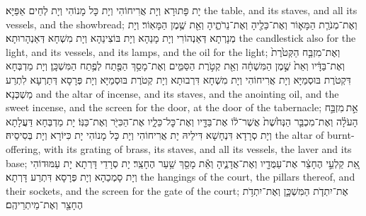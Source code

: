 {{יָת פָּתוּרָא וְיָת אֲרִיחוֹהִי וְיָת כָּל מָנוֹהִי וְיָת לְחֵים אַפַּיָּא׃}
{the table, and its staves, and all its vessels, and the showbread;}{}
{וְאֶת־מְנֹרַ֧ת הַמָּא֛וֹר וְאֶת־כֵּלֶ֖יהָ וְאֶת־נֵרֹתֶ֑יהָ וְאֵ֖ת שֶׁ֥מֶן הַמָּאֽוֹר׃
}
{וְיָת מְנָרְתָא דְּאַנְהוֹרִי וְיָת מָנַהָא וְיָת בּוֹצִינַהָא וְיָת מִשְׁחָא דְּאַנְהָרוּתָא׃}
{the candlestick also for the light, and its vessels, and its lamps, and the oil for the light;}{}
{וְאֶת־מִזְבַּ֤ח הַקְּטֹ֙רֶת֙ וְאֶת־בַּדָּ֔יו וְאֵת֙ שֶׁ֣מֶן הַמִּשְׁחָ֔ה וְאֵ֖ת קְטֹ֣רֶת הַסַּמִּ֑ים וְאֶת־מָסַ֥ךְ הַפֶּ֖תַח לְפֶ֥תַח הַמִּשְׁכָּֽן׃
}
{וְיָת מַדְבְּחָא דִּקְטֹרֶת בּוּסְמַיָּא וְיָת אֲרִיחוֹהִי וְיָת מִשְׁחָא דִּרְבוּתָא וְיָת קְטֹרֶת בּוּסְמַיָּא וְיָת פְּרָסָא דְּתַרְעָא לִתְרַע מַשְׁכְּנָא׃}
{and the altar of incense, and its staves, and the anointing oil, and the sweet incense, and the screen for the door, at the door of the tabernacle;}{}
{אֵ֣ת \legarmeh  מִזְבַּ֣ח הָעֹלָ֗ה וְאֶת־מִכְבַּ֤ר הַנְּחֹ֙שֶׁת֙ אֲשֶׁר־ל֔וֹ אֶת־בַּדָּ֖יו וְאֶת־כׇּל־כֵּלָ֑יו אֶת־הַכִּיֹּ֖ר וְאֶת־כַּנּֽוֹ׃}
{יָת מַדְבְּחָא דַּעֲלָתָא וְיָת סְרָדָא דִּנְחָשָׁא דִּילֵיהּ יָת אֲרִיחוֹהִי וְיָת כָּל מָנוֹהִי יָת כִּיּוֹרָא וְיָת בְּסִיסֵיהּ׃}
{the altar of burnt-offering, with its grating of brass, its staves, and all its vessels, the laver and its base;}{}
{אֵ֚ת קַלְעֵ֣י הֶחָצֵ֔ר אֶת־עַמֻּדָ֖יו וְאֶת־אֲדָנֶ֑יהָ וְאֵ֕ת מָסַ֖ךְ שַׁ֥עַר הֶחָצֵֽר׃
}
{יָת סְרָדֵי דָּרְתָא יָת עַמּוּדוֹהִי וְיָת סָמְכַהָא וְיָת פְּרָסָא דִּתְרַע דָּרְתָא׃}
{the hangings of the court, the pillars thereof, and their sockets, and the screen for the gate of the court;}{}
{אֶת־יִתְדֹ֧ת הַמִּשְׁכָּ֛ן וְאֶת־יִתְדֹ֥ת הֶחָצֵ֖ר וְאֶת־מֵיתְרֵיהֶֽם׃
}
}
